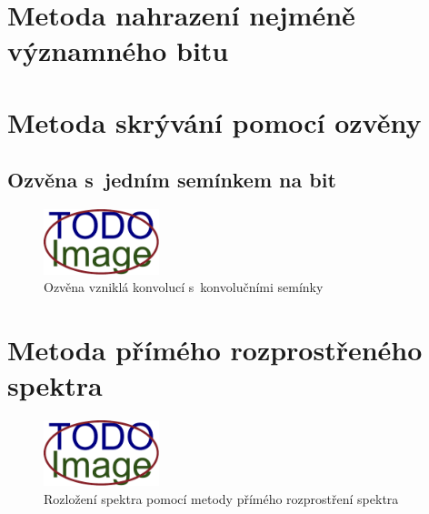 \section{Metoda nahrazení nejméně významného bitu}
\label{sec:lsb}


\blindtext

\blindtext

\blindtext

\section{Metoda skrývání pomocí ozvěny}
\label{sec:echo-hiding}


\blindtext

\blindtext

\subsection*{Ozvěna s~jedním semínkem na bit}
\label{sec:echo-single-kernel}


\blindtext

\begin{figure}[hbt]
    \centering
    \includegraphics[width=0.3\textwidth]{obrazky/placeholder.pdf}
    \caption{Ozvěna vzniklá konvolucí s~konvolučními semínky}
    \label{pic:echo-single-kernel-echo}
\end{figure}

\blindtext

\section{Metoda přímého rozprostřeného spektra}
\label{sec:dsss}


\blindtext

\begin{figure}[hbt]
    \centering
    \includegraphics[width=0.3\textwidth]{obrazky/placeholder.pdf}
    \caption{Rozložení spektra pomocí metody přímého rozprostření spektra}
    \label{pic:dsss-spreading}
\end{figure}

